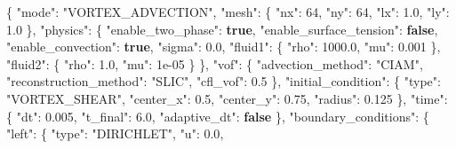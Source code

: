 \documentclass[
  10pt,
]{article}
\newenvironment{Shaded}{}{}
\newcommand{\DataTypeTok}[1]{\textcolor[rgb]{0.56,0.13,0.00}{#1}}
\newcommand{\DecValTok}[1]{\textcolor[rgb]{0.25,0.63,0.44}{#1}}
\newcommand{\FloatTok}[1]{\textcolor[rgb]{0.25,0.63,0.44}{#1}}
\newcommand{\FunctionTok}[1]{\textcolor[rgb]{0.02,0.16,0.49}{#1}}
\newcommand{\KeywordTok}[1]{\textcolor[rgb]{0.00,0.44,0.13}{\textbf{#1}}}
\newcommand{\StringTok}[1]{\textcolor[rgb]{0.25,0.44,0.63}{#1}}
\begin{document}
\begin{Shaded}
\begin{Highlighting}[]
\FunctionTok{\{}
  \DataTypeTok{"mode"}\FunctionTok{:} \StringTok{"VORTEX\_ADVECTION"}\FunctionTok{,}
  \DataTypeTok{"mesh"}\FunctionTok{:} \FunctionTok{\{}
    \DataTypeTok{"nx"}\FunctionTok{:} \DecValTok{64}\FunctionTok{,}
    \DataTypeTok{"ny"}\FunctionTok{:} \DecValTok{64}\FunctionTok{,}
    \DataTypeTok{"lx"}\FunctionTok{:} \FloatTok{1.0}\FunctionTok{,}
    \DataTypeTok{"ly"}\FunctionTok{:} \FloatTok{1.0}
  \FunctionTok{\},}
  \DataTypeTok{"physics"}\FunctionTok{:} \FunctionTok{\{}
    \DataTypeTok{"enable\_two\_phase"}\FunctionTok{:} \KeywordTok{true}\FunctionTok{,}
    \DataTypeTok{"enable\_surface\_tension"}\FunctionTok{:} \KeywordTok{false}\FunctionTok{,}
    \DataTypeTok{"enable\_convection"}\FunctionTok{:} \KeywordTok{true}\FunctionTok{,}
    \DataTypeTok{"sigma"}\FunctionTok{:} \FloatTok{0.0}\FunctionTok{,}
    \DataTypeTok{"fluid1"}\FunctionTok{:} \FunctionTok{\{}
      \DataTypeTok{"rho"}\FunctionTok{:} \FloatTok{1000.0}\FunctionTok{,}
      \DataTypeTok{"mu"}\FunctionTok{:} \FloatTok{0.001}
    \FunctionTok{\},}
    \DataTypeTok{"fluid2"}\FunctionTok{:} \FunctionTok{\{}
      \DataTypeTok{"rho"}\FunctionTok{:} \FloatTok{1.0}\FunctionTok{,}
      \DataTypeTok{"mu"}\FunctionTok{:} \DecValTok{1e{-}05}
    \FunctionTok{\}}
  \FunctionTok{\},}
  \DataTypeTok{"vof"}\FunctionTok{:} \FunctionTok{\{}
    \DataTypeTok{"advection\_method"}\FunctionTok{:} \StringTok{"CIAM"}\FunctionTok{,}
    \DataTypeTok{"reconstruction\_method"}\FunctionTok{:} \StringTok{"SLIC"}\FunctionTok{,}
    \DataTypeTok{"cfl\_vof"}\FunctionTok{:} \FloatTok{0.5}
  \FunctionTok{\},}
  \DataTypeTok{"initial\_condition"}\FunctionTok{:} \FunctionTok{\{}
    \DataTypeTok{"type"}\FunctionTok{:} \StringTok{"VORTEX\_SHEAR"}\FunctionTok{,}
    \DataTypeTok{"center\_x"}\FunctionTok{:} \FloatTok{0.5}\FunctionTok{,}
    \DataTypeTok{"center\_y"}\FunctionTok{:} \FloatTok{0.75}\FunctionTok{,}
    \DataTypeTok{"radius"}\FunctionTok{:} \FloatTok{0.125}
  \FunctionTok{\},}
  \DataTypeTok{"time"}\FunctionTok{:} \FunctionTok{\{}
    \DataTypeTok{"dt"}\FunctionTok{:} \FloatTok{0.005}\FunctionTok{,}
    \DataTypeTok{"t\_final"}\FunctionTok{:} \FloatTok{6.0}\FunctionTok{,}
    \DataTypeTok{"adaptive\_dt"}\FunctionTok{:} \KeywordTok{false}
  \FunctionTok{\},}
  \DataTypeTok{"boundary\_conditions"}\FunctionTok{:} \FunctionTok{\{}
    \DataTypeTok{"left"}\FunctionTok{:} \FunctionTok{\{}
      \DataTypeTok{"type"}\FunctionTok{:} \StringTok{"DIRICHLET"}\FunctionTok{,}
      \DataTypeTok{"u"}\FunctionTok{:} \FloatTok{0.0}\FunctionTok{,}

\end{Highlighting}
\end{Shaded}
\end{document}

